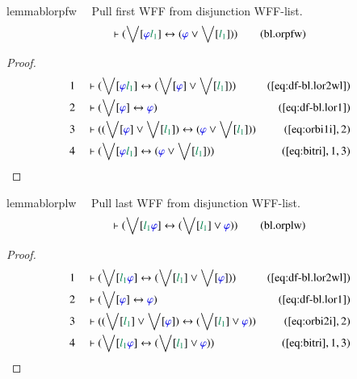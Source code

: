 \begin{restatable}{lemma}{blorpfw}~~ Pull first WFF from disjunction WFF-list.
\begin{align}
\vdash ( \bigvee[ \mw{\varphi} \mwl{l_1} ] \leftrightarrow ( \mw{\varphi} \vee
    \bigvee[ \mwl{l_1} ] ) )\label{eq:bl.orpfw}\tag{bl.orpfw}
\end{align}
\end{restatable}

\begin{proof}
\begin{align}
  1 &&  & \vdash ( \bigvee[ \mw{\varphi} \mwl{l_1} ] \leftrightarrow ( \bigvee[
      \mw{\varphi} ] \vee \bigvee[ \mwl{l_1} ] )
      )&(\mbox{\ref{eq:df-bl.lor2wl}})\notag
  \\ 2 &&  & \vdash ( \bigvee[ \mw{\varphi} ] \leftrightarrow \mw{\varphi}
      )&(\mbox{\ref{eq:df-bl.lor1}})\notag
  \\ 3 &&  & \vdash ( ( \bigvee[ \mw{\varphi} ] \vee \bigvee[ \mwl{l_1} ] )
      \leftrightarrow ( \mw{\varphi} \vee \bigvee[
      \mwl{l_1} ] ) )&(\mbox{\ref{eq:orbi1i}},2)\notag
  \\ 4 &&  & \vdash ( \bigvee[ \mw{\varphi} \mwl{l_1} ] \leftrightarrow (
      \mw{\varphi} \vee \bigvee[ \mwl{l_1} ] )
      )&(\mbox{\ref{eq:bitri}},1,3)\notag
\end{align}
\end{proof}

\begin{restatable}{lemma}{blorplw}~~ Pull last WFF from disjunction WFF-list.
\begin{align}
\vdash ( \bigvee[ \mwl{l_1} \mw{\varphi} ] \leftrightarrow ( \bigvee[ \mwl{l_1}
    ] \vee \mw{\varphi} ) )\label{eq:bl.orplw}\tag{bl.orplw}
\end{align}
\end{restatable}

\begin{proof}
\begin{align}
  1 &&  & \vdash ( \bigvee[ \mwl{l_1} \mw{\varphi} ] \leftrightarrow ( \bigvee[
      \mwl{l_1} ] \vee \bigvee[ \mw{\varphi} ] )
      )&(\mbox{\ref{eq:df-bl.lor2wl}})\notag
  \\ 2 &&  & \vdash ( \bigvee[ \mw{\varphi} ] \leftrightarrow \mw{\varphi}
      )&(\mbox{\ref{eq:df-bl.lor1}})\notag
  \\ 3 &&  & \vdash ( ( \bigvee[ \mwl{l_1} ] \vee \bigvee[ \mw{\varphi} ] )
      \leftrightarrow ( \bigvee[ \mwl{l_1} ] \vee
      \mw{\varphi} ) )&(\mbox{\ref{eq:orbi2i}},2)\notag
  \\ 4 &&  & \vdash ( \bigvee[ \mwl{l_1} \mw{\varphi} ] \leftrightarrow (
      \bigvee[ \mwl{l_1} ] \vee \mw{\varphi} )
      )&(\mbox{\ref{eq:bitri}},1,3)\notag
\end{align}
\end{proof}

